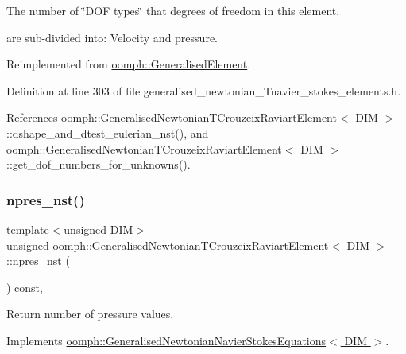 The number of \char`\"{}\+D\+O\+F types\char`\"{} that degrees of freedom in this element. 

are sub-\/divided into\+: Velocity and pressure. 

Reimplemented from \hyperlink{classoomph_1_1GeneralisedElement_a0c6037a870597b35dcf1c780710b9a56}{oomph\+::\+Generalised\+Element}.



Definition at line 303 of file generalised\+\_\+newtonian\+\_\+\+Tnavier\+\_\+stokes\+\_\+elements.\+h.



References oomph\+::\+Generalised\+Newtonian\+T\+Crouzeix\+Raviart\+Element$<$ D\+I\+M $>$\+::dshape\+\_\+and\+\_\+dtest\+\_\+eulerian\+\_\+nst(), and oomph\+::\+Generalised\+Newtonian\+T\+Crouzeix\+Raviart\+Element$<$ D\+I\+M $>$\+::get\+\_\+dof\+\_\+numbers\+\_\+for\+\_\+unknowns().

\mbox{\label{classoomph_1_1GeneralisedNewtonianTCrouzeixRaviartElement_a9292803fedb1000c418070b5c459834b}} 
\subsubsection{\texorpdfstring{npres\+\_\+nst()}{npres\_nst()}}
{\footnotesize\ttfamily template$<$unsigned D\+IM$>$ \\
unsigned \hyperlink{classoomph_1_1GeneralisedNewtonianTCrouzeixRaviartElement}{oomph\+::\+Generalised\+Newtonian\+T\+Crouzeix\+Raviart\+Element}$<$ D\+IM $>$\+::npres\+\_\+nst (\begin{DoxyParamCaption}{ }\end{DoxyParamCaption}) const\hspace{0.3cm}{\ttfamily [inline]}, {\ttfamily [virtual]}}



Return number of pressure values. 



Implements \hyperlink{classoomph_1_1GeneralisedNewtonianNavierStokesEquations_ad25a5d1b7a7e7cf128b9154f08739824}{oomph\+::\+Generalised\+Newtonian\+Navier\+Stokes\+Equations$<$ D\+I\+M $>$}.



